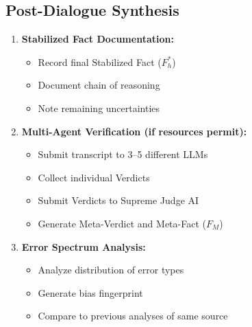 \documentclass[11pt,a4paper]{article}
\begin{document}
\subsection*{Post-Dialogue Synthesis}
\begin{enumerate}[leftmargin=*, resume]
    \item \textbf{Stabilized Fact Documentation:}
    \begin{itemize}[nosep]
        \item Record final Stabilized Fact ($F_h^*$)
        \item Document chain of reasoning
        \item Note remaining uncertainties
    \end{itemize}
    
    \item \textbf{Multi-Agent Verification (if resources permit):}
    \begin{itemize}[nosep]
        \item Submit transcript to 3--5 different LLMs
        \item Collect individual Verdicts
        \item Submit Verdicts to Supreme Judge AI
        \item Generate Meta-Verdict and Meta-Fact ($F_M$)
    \end{itemize}
    
    \item \textbf{Error Spectrum Analysis:}
    \begin{itemize}[nosep]
        \item Analyze distribution of error types
        \item Generate bias fingerprint
        \item Compare to previous analyses of same source
    \end{itemize}
\end{enumerate}
\end{document}

